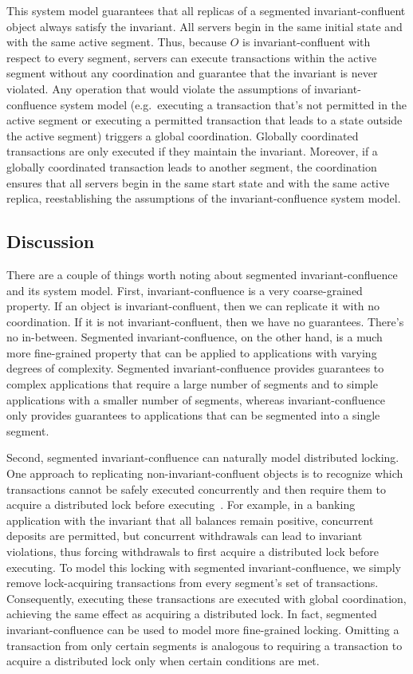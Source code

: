 This system model guarantees that all replicas of a segmented
invariant-confluent object always satisfy the invariant. All servers begin in
the same initial state and with the same active segment. Thus, because $O$ is
invariant-confluent with respect to every segment, servers can execute
transactions within the active segment without any coordination and guarantee
that the invariant is never violated. Any operation that would violate the
assumptions of invariant-confluence system model (e.g.\ executing a transaction
that's not permitted in the active segment or executing a permitted transaction
that leads to a state outside the active segment) triggers a global
coordination. Globally coordinated transactions are only executed if they
maintain the invariant. Moreover, if a globally coordinated transaction leads
to another segment, the coordination ensures that all servers begin in the same
start state and with the same active replica, reestablishing the assumptions of
the invariant-confluence system model.

\subsection{Discussion}
There are a couple of things worth noting about segmented invariant-confluence
and its system model. First, invariant-confluence is a very coarse-grained
property. If an object is invariant-confluent, then we can replicate it with no
coordination. If it is not invariant-confluent, then we have no guarantees.
There's no in-between. Segmented invariant-confluence, on the other hand, is a
much more fine-grained property that can be applied to applications with
varying degrees of complexity.  Segmented invariant-confluence provides
guarantees to complex applications that require a large number of segments and
to simple applications with a smaller number of segments, whereas
invariant-confluence only provides guarantees to applications that can be
segmented into a single segment.

Second, segmented invariant-confluence can naturally model distributed locking.
One approach to replicating non-invariant-confluent objects is to recognize
which transactions cannot be safely executed concurrently and then require them
to acquire a distributed lock before executing~\cite{balegas2015putting,
gotsman2016cause}. For example, in a banking application with the invariant
that all balances remain positive, concurrent deposits are permitted, but
concurrent withdrawals can lead to invariant violations, thus forcing
withdrawals to first acquire a distributed lock before executing. To model this
locking with segmented invariant-confluence, we simply remove lock-acquiring
transactions from every segment's set of transactions. Consequently, executing
these transactions are executed with global coordination, achieving the same
effect as acquiring a distributed lock. In fact, segmented invariant-confluence
can be used to model more fine-grained locking. Omitting a transaction from
only certain segments is analogous to requiring a transaction to acquire a
distributed lock only when certain conditions are met.

